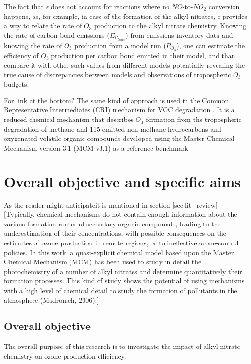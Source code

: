 \documentclass[11pt,a4paper]{article}
\begin{document}
The fact that $\epsilon$ does not account for reactions where no $NO$-to-$NO_2$ conversion happens, as, for example, in case of the formation of the alkyl nitrates, $\epsilon$ provides a way to relate the rate of $O_3$ production to the alkyl nitrate chemistry. Knowing the rate of carbon bond emissions ($E_{C_{bons}}$) from emissions inventory data and knowing the rate of $O_3$ production from a model run ($P_{O_3}$), one can estimate the efficiency of $O_3$ production per carbon bond emitted in their model, and than compare it with other such values from different models potentially revealing the true cause of discrepancies between models and observations of tropospheric $O_3$ budgets.

For link at the bottom? The same kind of approach is used in the Common Representative Intermediates (CRI) mechanism for VOC degradation \citep{Jenkin2002, Jenkin2008}. It is a reduced chemical mechanism that describes $O_3$ formation from the tropospheric degradation of methane and 115 emitted non-methane hydrocarbons and oxygenated volatile organic compounds developed using the Master Chemical Mechanism version 3.1 (MCM v3.1) as a reference benchmark
\section{Overall objective and specific aims}
As the reader might anticipateit is mentioned in section \ref{sec:lit_review}
\citep{Sommariva2008}
[Typically, chemical mechanisms do not contain
enough information about the various formation routes of secondary organic compounds, leading to the underestimation of their concentrations, with possible consequences on the estimates of ozone production in remote regions, or to ineffective ozone-control policies. In this work, a quasi-explicit chemical model based upon the Master Chemical Mechanism (MCM) has been used to study in detail the photochemistry of a number of alkyl nitrates and determine quantitatively their formation processes. This kind of study shows the potential of using mechanisms with a high level of chemical detail to study the formation of pollutants in the atmosphere (Madronich, 2006).]
\subsection{Overall objective}
The overall purpose of this research is to investigate the impact of alkyl nitrate chemistry on ozone production efficiency.
\end{document}
